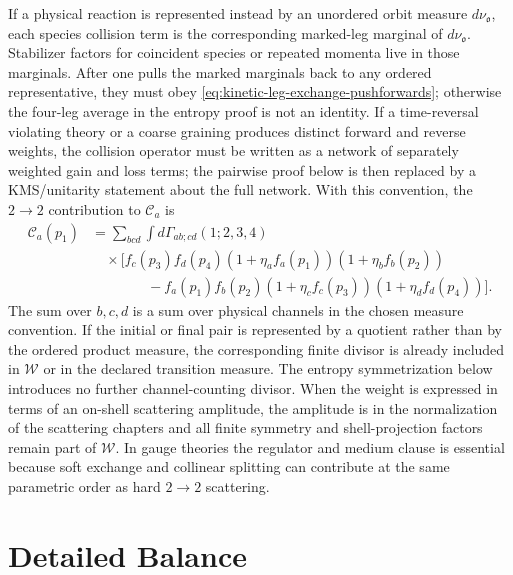 If a physical reaction is represented instead by an unordered orbit measure
\(d\nu_{\mathfrak o}\), each species collision term is the corresponding
marked-leg marginal of \(d\nu_{\mathfrak o}\).  Stabilizer factors for
coincident species or repeated momenta live in those marginals.  After one
pulls the marked marginals back to any ordered representative, they must obey
\eqref{eq:kinetic-leg-exchange-pushforwards}; otherwise the four-leg average
in the entropy proof is not an identity.  If a time-reversal violating theory
or a coarse graining produces distinct forward and reverse weights, the
collision operator must be written as a network of separately weighted gain
and loss terms; the pairwise proof below is then replaced by a KMS/unitarity
statement about the full network.
With this convention, the \(2\to2\) contribution to \(\mathcal C_a\) is
\begin{align}
  \mathcal C_a(p_1)
  &=
  \sum_{bcd}\int d\Gamma_{ab;cd}(1;2,3,4)
  \nonumber\\
  &\quad\times
  \Big[
  f_c(p_3)f_d(p_4)
  (1+\eta_a f_a(p_1))(1+\eta_b f_b(p_2))
  \nonumber\\
  &\qquad\qquad
  -
  f_a(p_1)f_b(p_2)
  (1+\eta_c f_c(p_3))(1+\eta_d f_d(p_4))
  \Big].
  \label{eq:kinetic-2to2-collision}
\end{align}
The sum over \(b,c,d\) is a sum over physical channels in the chosen measure
convention.  If the initial or final pair is represented by a quotient rather
than by the ordered product measure, the corresponding finite divisor is
already included in \(\mathcal W\) or in the declared transition measure.
The entropy symmetrization below introduces no further channel-counting
divisor.  When the weight is expressed in terms of an on-shell scattering
amplitude, the amplitude is in the normalization of the scattering chapters
and all finite symmetry and shell-projection factors remain part of
\(\mathcal W\).  In gauge theories the regulator and medium clause is
essential because soft exchange and collinear splitting can contribute at the
same parametric order as hard \(2\to2\) scattering.

\section{Detailed Balance}

